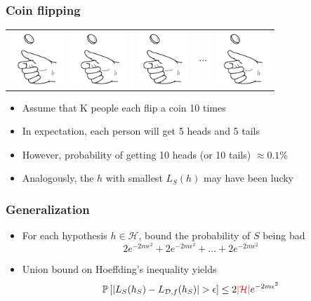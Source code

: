 \documentclass[10pt]{beamer}
\begin{document}
\begin{frame}
  \frametitle{Coin flipping}
  \begin{tabular}{ccccc}
	\includegraphics[height=2cm]{images/coinflip.png} &
	\includegraphics[height=2cm]{images/coinflip.png} &
	\includegraphics[height=2cm]{images/coinflip.png} &
	$\cdots$ &
	\includegraphics[height=2cm]{images/coinflip.png}
  \end{tabular}

  \vspace*{.5cm}

  \begin{itemize}
	\item Assume that K people each flip a coin 10 times
	\item In expectation, each person will get 5 heads and 5 tails
	\item However, probability of getting 10 heads (or 10 tails) $\approx 0.1\%$
	\item Analogously, the $h$ with smallest $L_S(h)$ may have been {\color{green} lucky}
  \end{itemize}
\end{frame}

\begin{frame}
  \frametitle{Generalization}
  \begin{itemize}
	\item For {\color{red} each} hypothesis $h\in\mathcal{H}$, bound the probability of $S$ being {\color{red} bad}
	\[
	2 e^{-2m\epsilon^2} + 2 e^{-2m\epsilon^2} + \ldots + 2 e^{-2m\epsilon^2}
	\]
	\item {\color{green} Union bound} on Hoeffding's inequality yields
	\[
	\mathbb{P}\left[|L_S(h_S) - L_{\mathcal{D},f}(h_S)| > \epsilon\right] \leq 2 {\color{red} |\mathcal{H}|}e^{-2m\epsilon^2}
	\]
  \end{itemize}
\end{frame}
\end{document}
